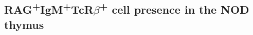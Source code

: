 

\subsection{RAG\textsuperscript{+}IgM\textsuperscript{+}TcR$\beta$\textsuperscript{+} cell presence in the NOD thymus}

